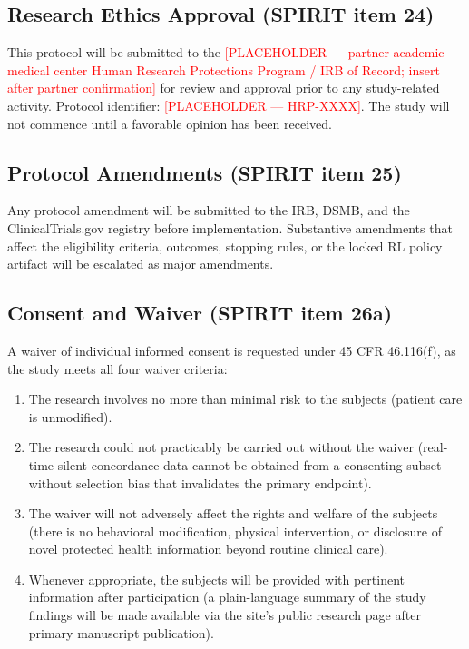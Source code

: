 \documentclass[11pt]{article}
\begin{document}
\subsection{Research Ethics Approval (SPIRIT item 24)}

This protocol will be submitted to the \textcolor{red}{[PLACEHOLDER --- partner academic medical center Human Research Protections Program / IRB of Record; insert after partner confirmation]} for review and approval prior to any study-related activity. Protocol identifier: \textcolor{red}{[PLACEHOLDER --- HRP-XXXX]}. The study will not commence until a favorable opinion has been received.

\subsection{Protocol Amendments (SPIRIT item 25)}

Any protocol amendment will be submitted to the IRB, DSMB, and the ClinicalTrials.gov registry before implementation. Substantive amendments that affect the eligibility criteria, outcomes, stopping rules, or the locked RL policy artifact will be escalated as major amendments.

\subsection{Consent and Waiver (SPIRIT item 26a)}

A waiver of individual informed consent is requested under 45 CFR 46.116(f), as the study meets all four waiver criteria:
\begin{enumerate}
  \item The research involves no more than minimal risk to the subjects (patient care is unmodified).
  \item The research could not practicably be carried out without the waiver (real-time silent concordance data cannot be obtained from a consenting subset without selection bias that invalidates the primary endpoint).
  \item The waiver will not adversely affect the rights and welfare of the subjects (there is no behavioral modification, physical intervention, or disclosure of novel protected health information beyond routine clinical care).
  \item Whenever appropriate, the subjects will be provided with pertinent information after participation (a plain-language summary of the study findings will be made available via the site's public research page after primary manuscript publication).
\end{enumerate}
\end{document}
